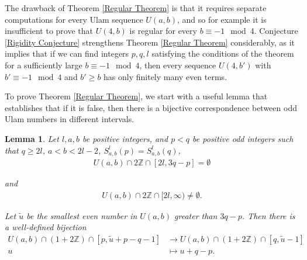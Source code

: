 \documentclass{amsart}
\newcommand{\ZZ}{\mathbb{Z}}
\theoremstyle{theorem}
\newtheorem{lemma}{Lemma}[section]
\theoremstyle{definition}
\begin{document}
The drawback of Theorem \ref{Regular Theorem} is that it requires separate computations for every Ulam sequence $U(a,b)$, and so for example it is insufficient to prove that $U(4,b)$ is regular for every $b \equiv -1 \mod 4$. Conjecture \ref{Rigidity Conjecture} strengthens Theorem \ref{Regular Theorem} considerably, as it implies that if we can find integers $p,q,l$ satisfying the conditions of the theorem for a sufficiently large $b \equiv -1 \mod 4$, then  every sequence $U(4,b')$ with $b' \equiv - 1 \mod 4$ and $b' \geq b$ has only finitely many even terms.

To prove Theorem \ref{Regular Theorem}, we start with a useful lemma that establishes that if it is false, then there is a bijective correspondence between odd Ulam numbers in different intervals.

\begin{lemma}\label{Regular Lemma}
Let $l, a, b$ be positive integers, and $p < q$ be positive odd integers such that $q \geq 2l$, $a < b < 2l - 2$, $S^l_{a,b}(p) = S^l_{a,b}(q)$,
	\begin{align*}
    U(a,b) \cap 2\ZZ \cap [2l, 3q - p] = \emptyset
    \end{align*}
    
\noindent and
	\begin{align*}
    U(a,b) \cap 2\ZZ \cap [2l,\infty) \neq \emptyset.
    \end{align*}
    
\noindent Let $\tilde{u}$ be the smallest even number in $U(a,b)$ greater than $3q - p$. Then there is a well-defined bijection
	\begin{align*}
    U(a,b) \cap (1 + 2\ZZ) \cap [p, \tilde{u} + p - q - 1] &\rightarrow U(a,b) \cap (1 + 2\ZZ) \cap [q, \tilde{u} - 1] \\
    u &\mapsto u + q - p.
    \end{align*}
\end{lemma}
\end{document}
